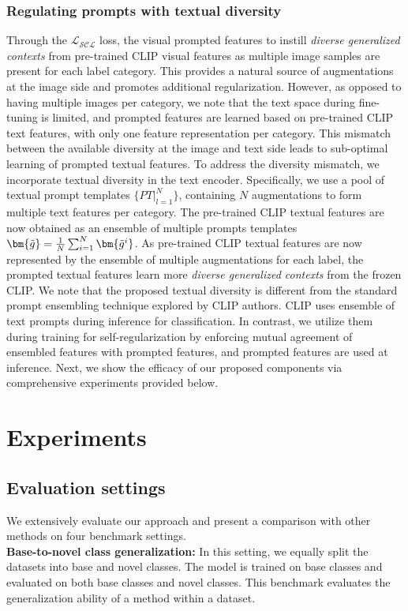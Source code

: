 \documentclass[10pt,twocolumn,letterpaper]{article}
\begin{document}
\subsubsection{Regulating prompts with textual diversity}
\label{textual_diversity_para}
Through the $\mathcal{L_{\text{SCL}}}$ loss, the visual prompted features to instill \textit{diverse generalized contexts} from pre-trained CLIP visual features as multiple image samples are present for each label category. This provides a natural source of augmentations at the image side and promotes additional regularization. However, as opposed to having multiple images per category, we note that the text space during fine-tuning is limited, and prompted features are learned based on pre-trained CLIP text features, with only one feature representation per category. This mismatch between the available diversity at the image and text side leads to sub-optimal learning of prompted textual features. To address the diversity mismatch, we incorporate textual diversity in the text encoder. Specifically, we use a pool of textual prompt templates $\{PT|_{l=1}^{N}\}$, containing $N$ augmentations to form multiple text features per category. The pre-trained CLIP textual features are now obtained as an ensemble of multiple prompts templates $\bm{\Tilde{g}} = \frac{1}{N} \sum_{i=1}^{N} \bm{\Tilde{g}^{i}}$. As pre-trained CLIP textual features are now represented by the ensemble of multiple augmentations for each label, the prompted textual features learn more \textit{diverse generalized contexts} from the frozen CLIP. We note that the proposed textual diversity is different from the standard prompt ensembling technique explored by CLIP authors. CLIP uses ensemble of text prompts during inference for classification. In contrast, we utilize them during training for self-regularization by enforcing mutual agreement of ensembled features with prompted features, and prompted features are used at inference. Next, we show the efficacy of our proposed components via comprehensive experiments provided below.



\section{Experiments}
\subsection{Evaluation settings}
We extensively evaluate our approach and present a comparison with other methods on four benchmark settings. \\
\textbf{Base-to-novel class generalization:} In this setting, we equally split the datasets into base and novel classes. The model is trained on base classes and evaluated on both base classes and novel classes. This benchmark evaluates the generalization ability of a method within a dataset. 
\end{document}
